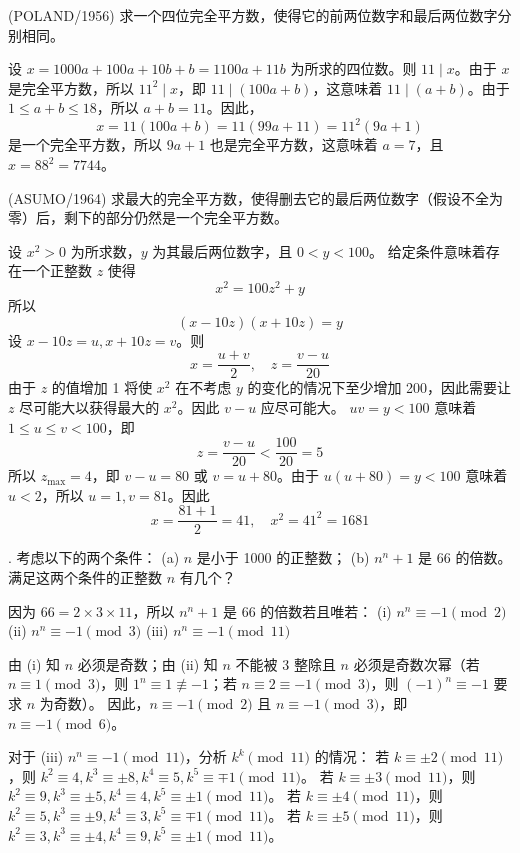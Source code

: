 \begin{questions}
\question (POLAND/1956) 求一个四位完全平方数，使得它的前两位数字和最后两位数字分别相同。

\begin{solution}
设 $x = 1000a + 100a + 10b + b = 1100a + 11b$ 为所求的四位数。则 $11 \mid x$。由于 $x$ 是完全平方数，所以 $11^2 \mid x$，即 $11 \mid (100a + b)$，这意味着 $11 \mid (a + b)$。由于 $1 \le a + b \le 18$，所以 $a + b = 11$。因此，
\[
x = 11(100a + b) = 11(99a + 11) = 11^2(9a + 1)
\]
是一个完全平方数，所以 $9a + 1$ 也是完全平方数，这意味着 $a = 7$，且 $x = 88^2 = 7744$。
\end{solution}

\question (ASUMO/1964) 求最大的完全平方数，使得删去它的最后两位数字（假设不全为零）后，剩下的部分仍然是一个完全平方数。

\begin{solution}
设 $x^2 > 0$ 为所求数，$y$ 为其最后两位数字，且 $0 < y < 100$。
给定条件意味着存在一个正整数 $z$ 使得
\[
x^2 = 100z^2 + y
\]
所以
\[
(x - 10z)(x + 10z) = y
\]
设 $x - 10z = u, x + 10z = v$。则
\[
x = \frac{u + v}{2}, \quad z = \frac{v - u}{20}
\]
由于 $z$ 的值增加 1 将使 $x^2$ 在不考虑 $y$ 的变化的情况下至少增加 200，因此需要让 $z$ 尽可能大以获得最大的 $x^2$。因此 $v - u$ 应尽可能大。
$uv = y < 100$ 意味着 $1 \le u \le v < 100$，即
\[
z = \frac{v - u}{20} < \frac{100}{20} = 5
\]
所以 $z_{\max} = 4$，即 $v - u = 80$ 或 $v = u + 80$。由于 $u(u + 80) = y < 100$ 意味着 $u < 2$，所以 $u = 1, v = 81$。因此
\[
x = \frac{81 + 1}{2} = 41, \quad x^2 = 41^2 = 1681
\]
\end{solution}

. 考虑以下的两个条件：
(a) $n$ 是小于 1000 的正整数；
(b) $n^n + 1$ 是 66 的倍数。
满足这两个条件的正整数 $n$ 有几个？

\begin{solution}
因为 $66 = 2 \times 3 \times 11$，所以 $n^n + 1$ 是 66 的倍数若且唯若：
(i) $n^n \equiv -1 \pmod 2$
(ii) $n^n \equiv -1 \pmod 3$
(iii) $n^n \equiv -1 \pmod{11}$

由 (i) 知 $n$ 必须是奇数；由 (ii) 知 $n$ 不能被 3 整除且 $n$ 必须是奇数次幂（若 $n \equiv 1 \pmod 3$，则 $1^n \equiv 1 \not\equiv -1$；若 $n \equiv 2 \equiv -1 \pmod 3$，则 $(-1)^n \equiv -1$ 要求 $n$ 为奇数）。
因此，$n \equiv -1 \pmod 2$ 且 $n \equiv -1 \pmod 3$，即 $n \equiv -1 \pmod 6$。

对于 (iii) $n^n \equiv -1 \pmod{11}$，分析 $k^k \pmod{11}$ 的情况：
若 $k \equiv \pm 2 \pmod{11}$，则 $k^2 \equiv 4, k^3 \equiv \pm 8, k^4 \equiv 5, k^5 \equiv \mp 1 \pmod{11}$。
若 $k \equiv \pm 3 \pmod{11}$，则 $k^2 \equiv 9, k^3 \equiv \pm 5, k^4 \equiv 4, k^5 \equiv \pm 1 \pmod{11}$。
若 $k \equiv \pm 4 \pmod{11}$，则 $k^2 \equiv 5, k^3 \equiv \pm 9, k^4 \equiv 3, k^5 \equiv \mp 1 \pmod{11}$。
若 $k \equiv \pm 5 \pmod{11}$，则 $k^2 \equiv 3, k^3 \equiv \pm 4, k^4 \equiv 9, k^5 \equiv \pm 1 \pmod{11}$。


\end{solution}
\end{questions}

